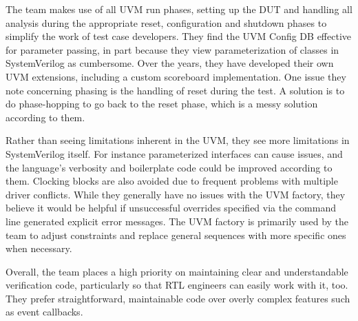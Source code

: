 The team makes use of all UVM run phases, setting up the DUT and handling all analysis during the appropriate reset,
configuration and shutdown phases to simplify the work of test case developers. They find the UVM Config DB effective
for parameter passing, in part because they view parameterization of classes in SystemVerilog as cumbersome. Over the
years, they have developed their own UVM extensions, including a custom scoreboard implementation. One issue they
note concerning phasing is the handling of reset during the test. A solution is to do phase-hopping to go back to the
reset phase, which is a messy solution according to them.

Rather than seeing limitations inherent in the UVM, they see more limitations in SystemVerilog itself. For instance
parameterized interfaces can cause issues, and the language's verbosity and boilerplate code could be improved
according to them. Clocking blocks are also avoided due to frequent problems with multiple driver conflicts. While
they generally have no issues with the UVM factory, they believe it would be helpful if unsuccessful overrides
specified via the command line generated explicit error messages. The UVM factory is primarily used by the team to
adjust constraints and replace general sequences with more specific ones when necessary.

Overall, the team places a high priority on maintaining clear and understandable verification code, particularly so
that RTL engineers can easily work with it, too. They prefer straightforward, maintainable code over overly complex
features such as event callbacks.

